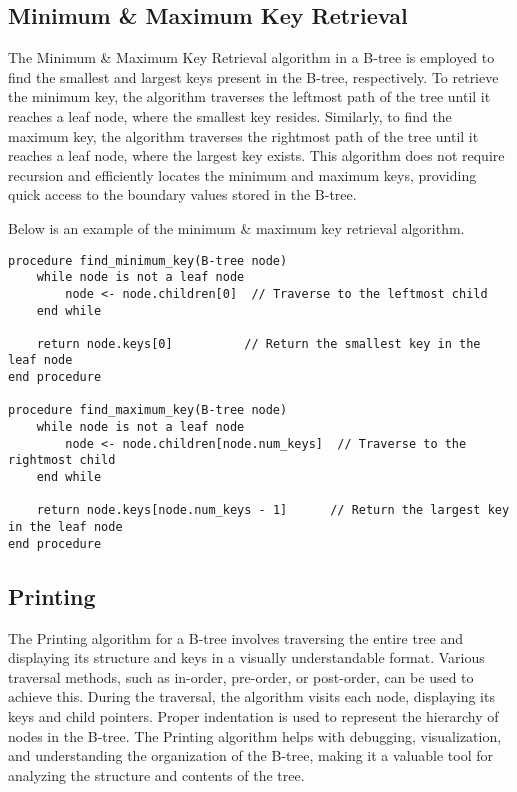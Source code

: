 \subsection*{Minimum \& Maximum Key Retrieval}

The Minimum \& Maximum Key Retrieval algorithm in a B-tree is employed to find the smallest and largest keys present in the B-tree, respectively. To retrieve the minimum key, the algorithm traverses the leftmost 
path of the tree until it reaches a leaf node, where the smallest key resides. Similarly, to find the maximum key, the algorithm traverses the rightmost path of the tree until it reaches a leaf node, where the 
largest key exists. This algorithm does not require recursion and efficiently locates the minimum and maximum keys, providing quick access to the boundary values stored in the B-tree.

\begin{highlight}

Below is an example of the minimum \& maximum key retrieval algorithm.

\horizontalline

\begin{verbatim}
procedure find_minimum_key(B-tree node)
    while node is not a leaf node
        node <- node.children[0]  // Traverse to the leftmost child
    end while

    return node.keys[0]          // Return the smallest key in the leaf node
end procedure

procedure find_maximum_key(B-tree node)
    while node is not a leaf node
        node <- node.children[node.num_keys]  // Traverse to the rightmost child
    end while

    return node.keys[node.num_keys - 1]      // Return the largest key in the leaf node
end procedure
\end{verbatim}
    
\end{highlight}

\subsection*{Printing}

The Printing algorithm for a B-tree involves traversing the entire tree and displaying its structure and keys in a visually understandable format. Various traversal methods, such as in-order, pre-order, or 
post-order, can be used to achieve this. During the traversal, the algorithm visits each node, displaying its keys and child pointers. Proper indentation is used to represent the hierarchy of nodes in the 
B-tree. The Printing algorithm helps with debugging, visualization, and understanding the organization of the B-tree, making it a valuable tool for analyzing the structure and contents of the tree.

